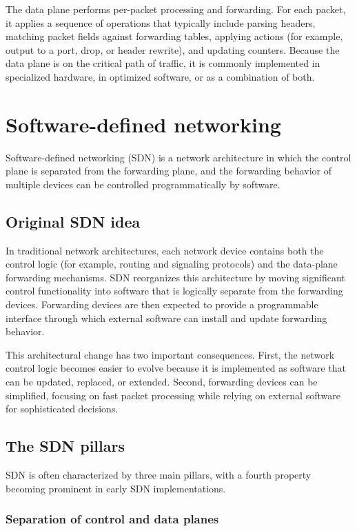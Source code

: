 \documentclass[11pt,a4paper,openany]{report}
\begin{document}
The data plane performs per-packet processing and forwarding. For each packet, it applies a sequence of operations that typically include parsing headers, matching packet fields against forwarding tables, applying actions (for example, output to a port, drop, or header rewrite), and updating counters. Because the data plane is on the critical path of traffic, it is commonly implemented in specialized hardware, in optimized software, or as a combination of both.

\section{Software-defined networking}

Software-defined networking (SDN) is a network architecture in which the control plane is separated from the forwarding plane, and the forwarding behavior of multiple devices can be controlled programmatically by software.

\subsection{Original SDN idea}

In traditional network architectures, each network device contains both the control logic (for example, routing and signaling protocols) and the data-plane forwarding mechanisms. SDN reorganizes this architecture by moving significant control functionality into software that is logically separate from the forwarding devices. Forwarding devices are then expected to provide a programmable interface through which external software can install and update forwarding behavior.

This architectural change has two important consequences. First, the network control logic becomes easier to evolve because it is implemented as software that can be updated, replaced, or extended. Second, forwarding devices can be simplified, focusing on fast packet processing while relying on external software for sophisticated decisions.

\subsection{The SDN pillars}

SDN is often characterized by three main pillars, with a fourth property becoming prominent in early SDN implementations.

\subsubsection*{Separation of control and data planes}
\end{document}
